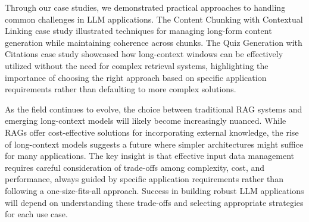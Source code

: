 Through our case studies, we demonstrated practical approaches to handling common challenges in LLM applications. The Content Chunking with Contextual Linking case study illustrated techniques for managing long-form content generation while maintaining coherence across chunks. The Quiz Generation with Citations case study showcased how long-context windows can be effectively utilized without the need for complex retrieval systems, highlighting the importance of choosing the right approach based on specific application requirements rather than defaulting to more complex solutions.

As the field continues to evolve, the choice between traditional RAG systems and emerging long-context models will likely become increasingly nuanced. While RAGs offer cost-effective solutions for incorporating external knowledge, the rise of long-context models suggests a future where simpler architectures might suffice for many applications. The key insight is that effective input data management requires careful consideration of trade-offs among complexity, cost, and performance, always guided by specific application requirements rather than following a one-size-fits-all approach. Success in building robust LLM applications will depend on understanding these trade-offs and selecting appropriate strategies for each use case.




